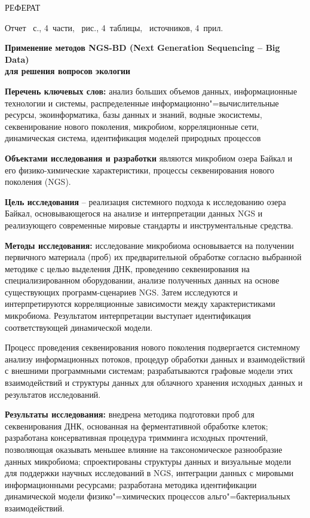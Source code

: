 \documentclass[a4paper,12pt,openany,final]{extreport}
\begin{document}
\begin{titlepage}
  \thispagestyle{empty}
  \begin{center}
    {\capfont РЕФЕРАТ}
  \end{center}

Отчет \pageref{LastPage}~с., 4~части, ~рис., 4~таблицы, ~источников, 4~прил.
\begin{center}
\textbf{Применение методов NGS-BD (Next Generation Sequencing -- Big Data)\\ для решения вопросов экологии}
\end{center}

\newcommand\RAZ[1]{{\bfseries #1}}

\RAZ{Перечень ключевых слов:} анализ больших объемов данных, информационные технологии и системы, распределенные информационно"=вычислительные ресурсы, экоинформатика, базы данных и знаний, водные экосистемы, секвенирование нового поколения, микробиом, корреляционные сети, динамическая система, идентификация моделей природных процессов

\RAZ{Объектами исследования и разработки} являются микробиом озера Байкал и его физико-химические характеристики, процессы секвенирования нового поколения (NGS).

\RAZ{Цель исследования} -- реализация системного подхода к исследованию озера Байкал, основывающегося на анализе и интерпретации данных NGS и реализующего современные мировые стандарты и инструментальные средства.

\RAZ{Методы исследования:} исследование микробиома основывается на получении первичного материала (проб) их предварительной обработке согласно выбранной методике с целью выделения ДНК, проведению секвенирования на специализированном оборудовании, анализе полученных данных на основе существующих программ-сценариев NGS. Затем исследуются и интерпретируются корреляционные зависимости между характеристиками микробиома. Результатом интерпретации выступает идентификация соответствующей динамической модели.

Процесс проведения секвенирования нового поколения подвергается системному анализу информационных потоков, процедур обработки данных и взаимодействий с внешними программными системам; разрабатываются графовые модели этих взаимодействий и структуры данных для облачного хранения исходных данных и результатов исследований.

\RAZ{Результаты исследования:} внедрена методика подготовки проб для секвенирования ДНК, основанная на ферментативной обработке клеток; разработана консервативная процедура тримминга исходных прочтений, позволяющая оказывать меньшее влияние на таксономическое разнообразие данных микробиома; спроектированы структуры данных и визуальные модели для поддержки научных исследований в NGS, интеграции данных с мировыми информационными ресурсами; разработана методика идентификации динамической модели физико"=химических процессов альго"=бактериальных взаимодействий.


\end{titlepage}
\end{document}
